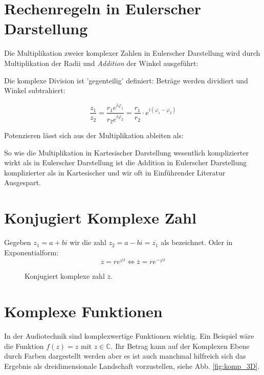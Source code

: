 \section{Rechenregeln in Eulerscher Darstellung}

Die Multiplikation zweier komplexer Zahlen in Eulerscher Darstellung wird durch Multiplikation der Radii und \emph{Addition} der Winkel ausgeführt:


Die komplexe Division ist 'gegenteilig' definiert: Beträge werden dividiert und Winkel subtrahiert:

$$\frac{z_1}{z_2} = \frac{r_1e^{i\varphi_1}} { r_2e^{i\varphi_2}} =  \frac{r_1}{ r_2} \cdot e^{i (\varphi_1 - \varphi_2)}$$


Potenzieren lässt sich aus der Multiplikation ableiten als: 


So wie die Multiplikation in Kartesischer Darstellung wesentlich komplizierter wirkt als in Eulerscher Darstellung ist die Addition in Eulerscher Darstellung komplizierter als in Kartesischer und wir oft in Einführender Literatur Ausgespart.


\section{Konjugiert Komplexe Zahl}
Gegeben $z_1 = a + bi$ wir die zahl $z_2 = a - bi = \overline{z_1}$ als  bezeichnet. Oder in Exponentialform:
$$z = re^{\varphi i} \iff \overline{z} = re^{-\varphi i}$$

\begin{figure}[h]
	\centering
	
	\caption{Konjugiert komplexe zahl $\overline{z}$.}
	\label{fig:komp_conju}
\end{figure}


\section{Komplexe Funktionen}
In der Audiotechnik sind komplexwertige Funktionen wichtig. Ein Beispiel wäre die Funktion $f(z) = z$ mit $z \in \mathbb{C}$. Ihr Betrag kann auf der Komplexen Ebene durch Farben dargestellt werden aber es ist auch manchmal hilfreich sich das Ergebnis als dreidimensionale Landschaft vorzustellen, siehe Abb. \ref{fig:komp_3D}. 

